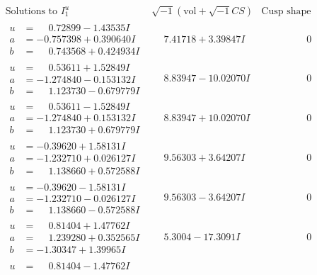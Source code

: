 \documentclass[1p]{elsarticle_modified}
\theoremstyle{definition}
\newcommand{\I}{\sqrt{-1}}
\begin{document}
$$\begin{array}{c|c|c}
\text{Solutions to }I^u_{1}& \I (\text{vol} + \sqrt{-1}CS) & \text{Cusp shape}\\
 \hline 
\begin{aligned}
u &= \phantom{-}0.72899 - 1.43535 I \\
a &= -0.757398 + 0.390640 I \\
b &= \phantom{-}0.743568 + 0.424934 I\end{aligned}
 & \phantom{-}7.41718 + 3.39847 I & \phantom{-0.000000 } 0 \\ \hline\begin{aligned}
u &= \phantom{-}0.53611 + 1.52849 I \\
a &= -1.274840 - 0.153132 I \\
b &= \phantom{-}1.123730 - 0.679779 I\end{aligned}
 & \phantom{-}8.83947 - 10.02070 I & \phantom{-0.000000 } 0 \\ \hline\begin{aligned}
u &= \phantom{-}0.53611 - 1.52849 I \\
a &= -1.274840 + 0.153132 I \\
b &= \phantom{-}1.123730 + 0.679779 I\end{aligned}
 & \phantom{-}8.83947 + 10.02070 I & \phantom{-0.000000 } 0 \\ \hline\begin{aligned}
u &= -0.39620 + 1.58131 I \\
a &= -1.232710 + 0.026127 I \\
b &= \phantom{-}1.138660 + 0.572588 I\end{aligned}
 & \phantom{-}9.56303 + 3.64207 I & \phantom{-0.000000 } 0 \\ \hline\begin{aligned}
u &= -0.39620 - 1.58131 I \\
a &= -1.232710 - 0.026127 I \\
b &= \phantom{-}1.138660 - 0.572588 I\end{aligned}
 & \phantom{-}9.56303 - 3.64207 I & \phantom{-0.000000 } 0 \\ \hline\begin{aligned}
u &= \phantom{-}0.81404 + 1.47762 I \\
a &= \phantom{-}1.239280 + 0.352565 I \\
b &= -1.30347 + 1.39965 I\end{aligned}
 & \phantom{-}5.3004 - 17.3091 I & \phantom{-0.000000 } 0 \\ \hline\begin{aligned}
u &= \phantom{-}0.81404 - 1.47762 I \\

\end{aligned}
\end{array}$$
\end{document}
